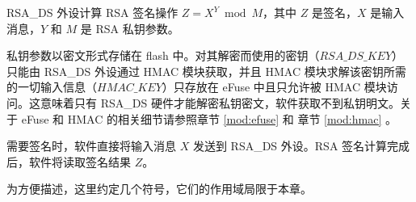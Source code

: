 \documentclass[main\_\_CN.tex]{subfiles}
\begin{document}
RSA\_DS 外设计算 RSA 签名操作 \begin{math}Z = X^{Y} \bmod M\end{math}，其中 \begin{math}Z\end{math} 是签名，\begin{math}X\end{math} 是输入消息，\begin{math}Y\end{math} 和 \begin{math}M\end{math} 是 RSA 私钥参数。

私钥参数以密文形式存储在 flash 中。对其解密而使用的密钥（\begin{math} RSA\_DS\_KEY \end{math}） 只能由 RSA\_DS 外设通过 HMAC 模块获取，并且 HMAC 模块求解该密钥所需的一切输入信息（\begin{math} HMAC\_KEY \end{math}）只存放在 eFuse 中且只允许被 HMAC 模块访问。这意味着只有 RSA\_DS 硬件才能解密私钥密文，软件获取不到私钥明文。关于 eFuse 和 HMAC 的相关细节请参照章节 \ref{mod:efuse} \textit{} 和 章节 \ref{mod:hmac} \textit{}。

需要签名时，软件直接将输入消息 \begin{math}X\end{math} 发送到 RSA\_DS 外设。RSA 签名计算完成后，软件将读取签名结果 \begin{math}Z\end{math}。


为方便描述，这里约定几个符号，它们的作用域局限于本章。
\end{document}
